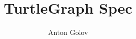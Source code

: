 \documentclass[12pt,a4paper]{article}
\title{TurtleGraph Spec}
\author{Anton Golov}
\begin{document}
	\maketitle{}
	\tableofcontents{}
\end{document}
